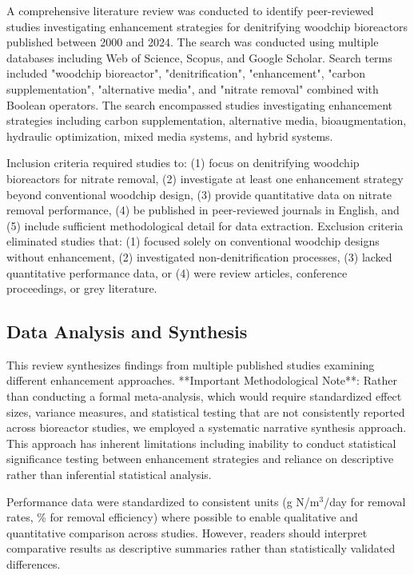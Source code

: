 \documentclass[12pt,a4paper]{article}
\begin{document}
A comprehensive literature review was conducted to identify peer-reviewed studies investigating enhancement strategies for denitrifying woodchip bioreactors published between 2000 and 2024. The search was conducted using multiple databases including Web of Science, Scopus, and Google Scholar. Search terms included "woodchip bioreactor", "denitrification", "enhancement", "carbon supplementation", "alternative media", and "nitrate removal" combined with Boolean operators. The search encompassed studies investigating enhancement strategies including carbon supplementation, alternative media, bioaugmentation, hydraulic optimization, mixed media systems, and hybrid systems.

Inclusion criteria required studies to: (1) focus on denitrifying woodchip bioreactors for nitrate removal, (2) investigate at least one enhancement strategy beyond conventional woodchip design, (3) provide quantitative data on nitrate removal performance, (4) be published in peer-reviewed journals in English, and (5) include sufficient methodological detail for data extraction. Exclusion criteria eliminated studies that: (1) focused solely on conventional woodchip designs without enhancement, (2) investigated non-denitrification processes, (3) lacked quantitative performance data, or (4) were review articles, conference proceedings, or grey literature.

\subsection{Data Analysis and Synthesis}

This review synthesizes findings from multiple published studies examining different enhancement approaches. **Important Methodological Note**: Rather than conducting a formal meta-analysis, which would require standardized effect sizes, variance measures, and statistical testing that are not consistently reported across bioreactor studies, we employed a systematic narrative synthesis approach. This approach has inherent limitations including inability to conduct statistical significance testing between enhancement strategies and reliance on descriptive rather than inferential statistical analysis.

Performance data were standardized to consistent units (g N/m$^3$/day for removal rates, \% for removal efficiency) where possible to enable qualitative and quantitative comparison across studies. However, readers should interpret comparative results as descriptive summaries rather than statistically validated differences.
\end{document}
